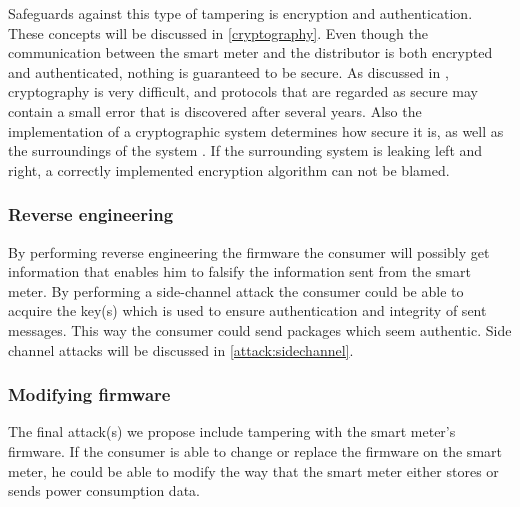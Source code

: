 Safeguards against this type of tampering is encryption and authentication. 
These concepts will be discussed in \cref{cryptography}.
Even though the communication between the smart meter and the distributor is both encrypted and authenticated, nothing is guaranteed to be secure.
As discussed in \citet{cryptoenginering}, cryptography is very difficult, and protocols that are regarded as secure may contain a small error that is discovered after several years.
Also the implementation of a cryptographic system determines how secure it is, as well as the surroundings of the system \citep{cryptoenginering}. 
If the surrounding system is leaking left and right, a correctly implemented encryption algorithm can not be blamed.

\subsubsection{Reverse engineering}
By performing reverse engineering the firmware the consumer will possibly get information that enables him to falsify the information sent from the smart meter.
By performing a side-channel attack the consumer could be able to acquire the key(s) which is used to ensure authentication and integrity of sent messages.
This way the consumer could send packages which seem authentic.
Side channel attacks will be discussed in \cref{attack:sidechannel}.

\subsubsection{Modifying firmware}
The final attack(s) we propose include tampering with the smart meter's firmware.
If the consumer is able to change or replace the firmware on the smart meter, he could be able to modify the way that the smart meter either stores or sends power consumption data.
